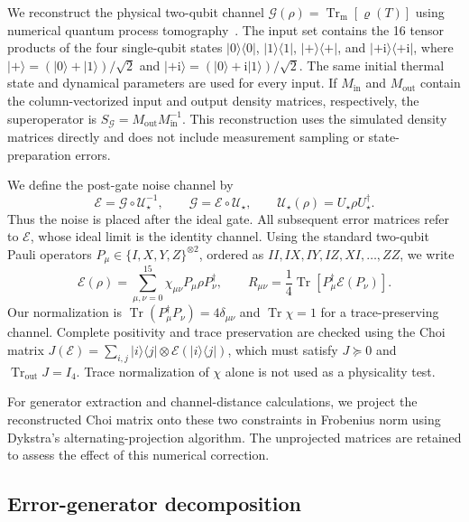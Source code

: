 \documentclass[a4paper,11pt]{article}
\newcommand{\ii}{\mathrm{i}}
\newcommand{\Tr}{\operatorname{Tr}}
\newcommand{\ket}[1]{\lvert #1\rangle}
\newcommand{\bra}[1]{\langle #1\rvert}
\begin{document}
We reconstruct the physical two-qubit channel
$\mathcal G(\rho)=\Tr_{\mathrm m}[\varrho(T)]$
using numerical quantum process tomography~\cite{QPT}. The input set
contains the 16 tensor products of the four single-qubit states
$\ket0\bra0$, $\ket1\bra1$, $\ket+\bra+$, and
$\ket{+\ii}\bra{+\ii}$, where
$\ket+=(\ket0+\ket1)/\sqrt2$ and
$\ket{+\ii}=(\ket0+\ii\ket1)/\sqrt2$.
The same initial thermal state and dynamical parameters are used for
every input. If $M_{\mathrm{in}}$ and $M_{\mathrm{out}}$ contain the
column-vectorized input and output density matrices, respectively, the
superoperator is $S_{\mathcal G}=M_{\mathrm{out}}M_{\mathrm{in}}^{-1}$.
This reconstruction uses the simulated density matrices directly and
does not include measurement sampling or state-preparation errors.

We define the post-gate noise channel by
\begin{equation}
 \mathcal E=\mathcal G\circ\mathcal U_\star^{-1},
 \qquad \mathcal G=\mathcal E\circ\mathcal U_\star,
 \qquad \mathcal U_\star(\rho)=U_\star\rho U_\star^\dagger.
 \label{eq:methods_postgate}
\end{equation}
Thus the noise is placed after the ideal gate. All subsequent error
matrices refer to $\mathcal E$, whose ideal limit is the identity channel.
Using the standard two-qubit Pauli operators
$P_\mu\in\{I,X,Y,Z\}^{\otimes2}$, ordered as
$II,IX,IY,IZ,XI,\ldots,ZZ$, we write
\begin{equation}
 \mathcal E(\rho)=\sum_{\mu,\nu=0}^{15}
       \chi_{\mu\nu}P_\mu\rho P_\nu^\dagger,
 \qquad
 R_{\mu\nu}=\frac14\Tr\!\left[P_\mu^\dagger\mathcal E(P_\nu)\right].
 \label{eq:methods_representations}
\end{equation}
Our normalization is $\Tr(P_\mu^\dagger P_\nu)=4\delta_{\mu\nu}$
and $\Tr\chi=1$ for a trace-preserving channel. Complete positivity and
trace preservation are checked using the Choi matrix
$J(\mathcal E)=\sum_{i,j}\ket i\bra j\otimes\mathcal E(\ket i\bra j)$,
which must satisfy $J\succeq0$ and $\Tr_{\mathrm{out}}J=I_4$.
Trace normalization of $\chi$ alone is not used as a physicality test.

For generator extraction and channel-distance calculations, we project
the reconstructed Choi matrix onto these two constraints in Frobenius
norm using Dykstra's alternating-projection algorithm. The unprojected
matrices are retained to assess the effect of this numerical correction.

\subsection{Error-generator decomposition}
\label{subsec:error_generator}
\end{document}
